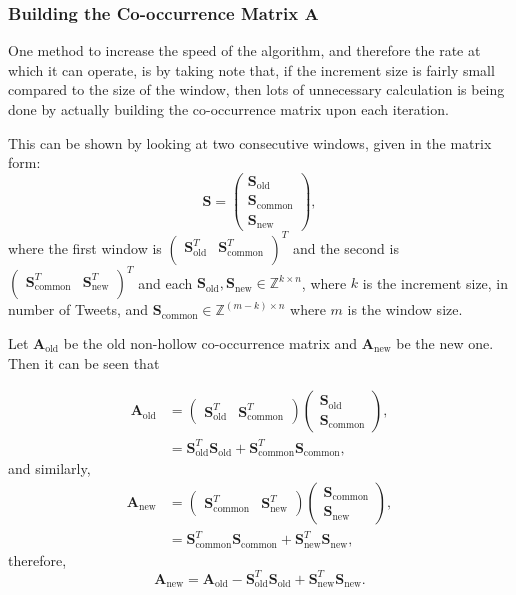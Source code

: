 \documentclass[11pt,a4paper]{article}
\newcommand{\smat}{\mathbf{S}}
\newcommand{\covmat}{\mathbf{A}}
\newcommand{\new}{_\text{new}}
\newcommand{\old}{_\text{old}}
\newcommand{\common}{_\text{common}}
\begin{document}
\subsubsection{Building the Co-occurrence Matrix $\covmat$}
One method to increase the speed of the algorithm, and therefore the rate at which it can operate, is by taking note that, if the increment size is fairly small compared to the size of the window, then lots of unnecessary calculation is being done by actually building the co-occurrence matrix upon each iteration. 

This can be shown by looking at two consecutive windows, given in the matrix form: 
\begin{equation*}
\smat = \left(\begin{matrix}
\smat_{\text{old}}\\
\smat_{\text{common}}\\
\smat_{\text{new}}
\end{matrix}\right),
\end{equation*}
where the first window is $\left(\begin{matrix}
\smat_{\text{old}}^T&
\smat_{\text{common}}^T\\
\end{matrix}\right)^T
$ and the second is $\left(\begin{matrix}
\smat_{\text{common}}^T&
\smat_{\text{new}}^T\\
\end{matrix}\right)^T
$
and each $\smat_{\text{old}}, \smat_{\text{new}} \in \mathbb{Z}^{k \times n}$, where $k$ is the increment size, in number of Tweets, and $\smat_{\text{common}} \in \mathbb{Z}^{(m-k) \times n}$ where $m$ is the window size. 

Let $\covmat_{\text{old}}$ be the old non-hollow co-occurrence matrix and $\covmat_{\text{new}}$ be the new one. Then it can be seen that

\begin{align*}
\covmat\old & = \left( \begin{matrix}
\smat\old^T & \smat\common^T
\end{matrix}\right)\left( \begin{matrix}
\smat\old \\ \smat\common
\end{matrix}\right),\\
& = 
\smat\old^T \smat\old+ \smat\common^T \smat\common,
\end{align*}
 and similarly, 
\begin{align*}
\covmat\new & = \left( \begin{matrix}
\smat\common^T & \smat\new^T
\end{matrix}\right)\left( \begin{matrix}
\smat\common \\ \smat\new
\end{matrix}\right),\\
& = 
\smat\common^T \smat\common+ \smat\new^T \smat\new,
\end{align*} 
therefore, 
\begin{equation}
\covmat\new = \covmat\old - \smat\old^T \smat\old + \smat\new^T\smat\new.
\end{equation}
\end{document}
